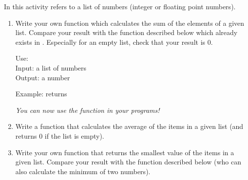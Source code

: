 \documentclass[11pt,class=report,crop=false]{standalone}
\begin{document}




\begin{activite}


In this activity  refers to a list of numbers (integer or floating point numbers). 

\begin{enumerate}
  \item Write your own function  which calculates the sum of the elements of a given list.
  Compare your result with the function  described below which already exists in \Python{}. Especially for an empty list, check that your result is $0$. 
  
  
  \begin{fonctionpython}
   Use: \\
   Input: a list of numbers\\
   Output: a number
  
  \medskip
     
  Example:  returns 
  \end{fonctionpython}   
  
  \emph{You can now use the function  in your programs!}
  
  
  \item Write a function  that calculates the average of the items in a given list (and returns $0$ if the list is empty). 
  
  \item Write your own function  that returns the smallest value of the items in a given list. Compare your result with the \Python{} function  described below (who can also calculate the minimum of two numbers).
  

\end{enumerate}
\end{activite}
\end{document}
